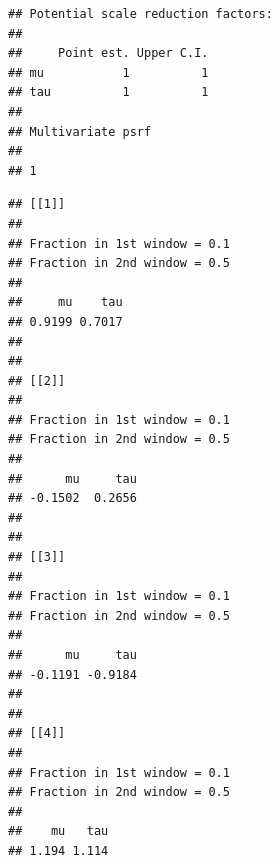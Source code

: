 \documentclass[
  11pt,
]{article}
\newenvironment{Shaded}{\begin{snugshade}}{\end{snugshade}}
\newcommand{\AttributeTok}[1]{\textcolor[rgb]{0.77,0.63,0.00}{#1}}
\newcommand{\CommentTok}[1]{\textcolor[rgb]{0.56,0.35,0.01}{\textit{#1}}}
\newcommand{\ConstantTok}[1]{\textcolor[rgb]{0.00,0.00,0.00}{#1}}
\newcommand{\ControlFlowTok}[1]{\textcolor[rgb]{0.13,0.29,0.53}{\textbf{#1}}}
\newcommand{\DecValTok}[1]{\textcolor[rgb]{0.00,0.00,0.81}{#1}}
\newcommand{\FunctionTok}[1]{\textcolor[rgb]{0.00,0.00,0.00}{#1}}
\newcommand{\NormalTok}[1]{#1}
\newcommand{\OtherTok}[1]{\textcolor[rgb]{0.56,0.35,0.01}{#1}}
\newcommand{\SpecialCharTok}[1]{\textcolor[rgb]{0.00,0.00,0.00}{#1}}
\begin{document}
\begin{Shaded}
\end{Shaded}

\begin{verbatim}
## Potential scale reduction factors:
## 
##     Point est. Upper C.I.
## mu           1          1
## tau          1          1
## 
## Multivariate psrf
## 
## 1
\end{verbatim}

\begin{verbatim}
## [[1]]
## 
## Fraction in 1st window = 0.1
## Fraction in 2nd window = 0.5 
## 
##     mu    tau 
## 0.9199 0.7017 
## 
## 
## [[2]]
## 
## Fraction in 1st window = 0.1
## Fraction in 2nd window = 0.5 
## 
##      mu     tau 
## -0.1502  0.2656 
## 
## 
## [[3]]
## 
## Fraction in 1st window = 0.1
## Fraction in 2nd window = 0.5 
## 
##      mu     tau 
## -0.1191 -0.9184 
## 
## 
## [[4]]
## 
## Fraction in 1st window = 0.1
## Fraction in 2nd window = 0.5 
## 
##    mu   tau 
## 1.194 1.114
\end{verbatim}
\end{document}
